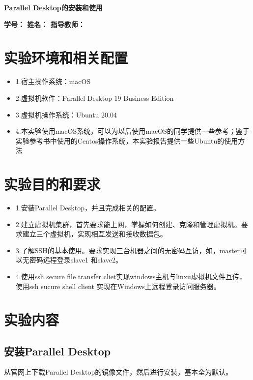 \documentclass{article}
\begin{document}
 \pingfang
\begin{center}
\textbf{\huge Parallel Desktop的安装和使用}
\end{center}
\begin{center}
    \textbf{\large \textbf{学号： \quad 姓名： \quad 指导教师：}}
\end{center}
\hrulefill
\section{实验环境和相关配置}
\begin{itemize}
    \item 1.宿主操作系统：macOS
    \item 2.虚拟机软件：Parallel Desktop 19 Business Edition
    \item 3.虚拟机操作系统：Ubuntu 20.04
    \item 4.本实验使用macOS系统，可以为以后使用macOS的同学提供一些参考；鉴于实验参考书中使用的Centos操作系统，本实验报告提供一些Ubuntu的使用方法
\end{itemize}
\section{实验目的和要求}
\begin{itemize}
    \item 1.安装Parallel Desktop，并且完成相关的配置。
    \item 2.建立虚拟机集群，首先要求能上网，掌握如何创建、克隆和管理虚拟机。要求建立三个虚拟机，实现相互发送和接收数据包。
    \item 3.了解SSH的基本使用。要求实现三台机器之间的无密码互访，如，master可以无密码远程登录slave1 和slave2。
    \item 4.使用ssh secure file transfer cliet实现windows主机与linxu虚拟机文件互传，使用ssh sucure shell client 实现在Windows上远程登录访问服务器。
\end{itemize}
\section{实验内容}
\subsection{安装Parallel Desktop}
\indent 从官网上下载Parallel Desktop的镜像文件，然后进行安装，基本全为默认。
\end{document}
